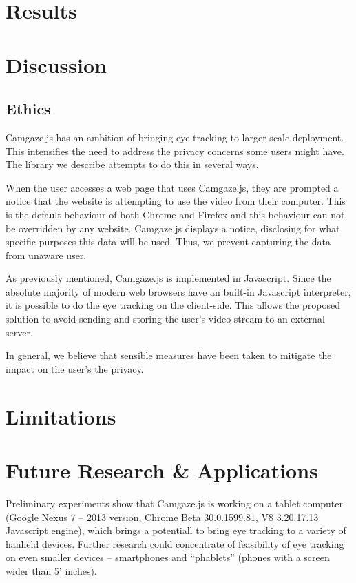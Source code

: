 \documentclass[annual]{acmsiggraph}
\begin{document}
\section{Results}

\section{Discussion}

\subsection{Ethics}

Camgaze.js has an ambition of bringing eye tracking to larger-scale deployment.
This intensifies the need to address the privacy concerns some users might
have. The library we describe attempts to do this in several ways.

When the user accesses a web page that uses Camgaze.js, they are prompted a
notice that the website is attempting to use the video from their computer.
This is the default behaviour of both Chrome and Firefox and this behaviour can
not be overridden by any website. Camgaze.js displays a notice, disclosing for
what specific purposes this data will be used. Thus, we prevent capturing the
data from unaware user.

As previously mentioned, Camgaze.js is implemented in Javascript. Since the
absolute majority of modern web browsers have an built-in Javascript
interpreter, it is possible to do the eye tracking on the client-side. This
allows the proposed solution to avoid sending and storing the user’s video
stream to an external server.

In general, we believe that sensible measures have been taken to mitigate the
impact on the user’s the privacy.

\section{Limitations}

\section{Future Research \& Applications}

Preliminary experiments show that Camgaze.js is working on a tablet computer
(Google Nexus 7 -- 2013 version, Chrome Beta 30.0.1599.81, V8 3.20.17.13
Javascript engine), which brings a potentiall to bring eye tracking to a
variety of hanheld devices. Further research could concentrate of feasibility
of eye tracking on even smaller devices -- smartphones and “phablets” (phones
with a screen wider than 5’ inches).
\end{document}
